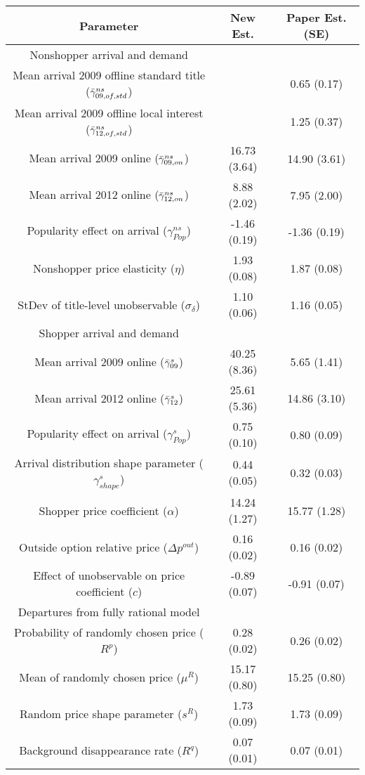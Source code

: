 \begin{table}[h]
\centering
\begin{tabular}{c|c|c}\toprule Parameter & New Est. & Paper Est. (SE)\\[2mm]\hline 
 Nonshopper arrival and demand  \\ 
 \hline
Mean arrival 2009 offline standard title ($\Bar{\gamma}^{ns}_{09,of,std}$) &  & 0.65 (0.17)\\ 
 Mean arrival 2009 offline local interest ($\Bar{\gamma}^{ns}_{12,of,std}$) &  & 1.25 (0.37)\\ 
 Mean arrival 2009 online ($\Bar{\gamma}^{ns}_{09,on}$) &  16.73 (3.64) & 14.90 (3.61)\\ 
 Mean arrival 2012 online ($\Bar{\gamma}^{ns}_{12,on}$) &  8.88 (2.02) & 7.95 (2.00)\\ 
 Popularity effect on arrival ($\gamma^{ns}_{Pop}$) &  -1.46 (0.19) & -1.36 (0.19)\\ 
 Nonshopper price elasticity ($\eta$) &  1.93 (0.08) & 1.87 (0.08)\\ 
 StDev of title-level unobservable ($\sigma_{\delta}$) &  1.10 (0.06) & 1.16 (0.05)\\ 
 \hline 
 Shopper arrival and demand  \\ 
 \hline
Mean arrival 2009 online ($\Bar{\gamma}^s_{09}$) &  40.25 (8.36) & 5.65 (1.41)\\ 
 Mean arrival 2012 online ($\Bar{\gamma}^s_{12}$) &  25.61 (5.36) & 14.86 (3.10)\\ 
 Popularity effect on arrival ($\gamma^{s}_{Pop}$) &  0.75 (0.10) & 0.80 (0.09)\\ 
 Arrival distribution shape parameter ($\gamma^s_{shape}$) &  0.44 (0.05) & 0.32 (0.03)\\ 
 Shopper price coefficient ($\alpha$) &  14.24 (1.27) & 15.77 (1.28)\\ 
 Outside option relative price ($\Delta p^{out}$) &  0.16 (0.02) & 0.16 (0.02)\\ 
 Effect of unobservable on price coefficient ($c$) &  -0.89 (0.07) & -0.91 (0.07)\\ 
 \hline 
 Departures from fully rational model  \\ 
 \hline
Probability of randomly chosen price ($R^p$) &  0.28 (0.02) & 0.26 (0.02)\\ 
 Mean of randomly chosen price ($\mu^R$) &  15.17 (0.80) & 15.25 (0.80)\\ 
 Random price shape parameter ($s^R$) &  1.73 (0.09) & 1.73 (0.09)\\ 
 Background disappearance rate ($R^q$) &  0.07 (0.01) & 0.07 (0.01)\\ 
 \end{tabular}\label{tab:my_label}\end{table}